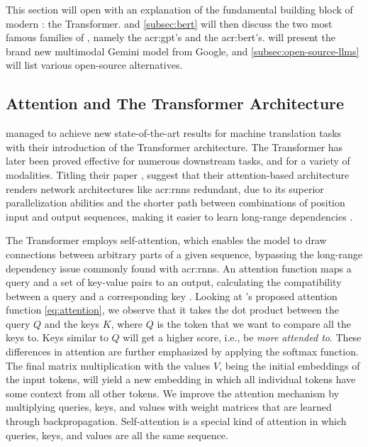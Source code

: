 This section will open with an explanation of the fundamental building block of modern : the Transformer.  and \autoref{subsec:bert} will then discuss the two most famous families of , namely the \acrshort{acr:gpt}'s and the \acrshort{acr:bert}'s.  will present the brand new multimodal Gemini model from Google, and \autoref{subsec:open-source-llms} will list various open-source alternatives.

\subsection{Attention and The Transformer Architecture}\label{subsec:attention-and-transformers}

\cite{vaswaniAttentionAllYou2017} managed to achieve new state-of-the-art results for machine translation tasks with their introduction of the Transformer architecture. The Transformer has later been proved effective for numerous downstream tasks, and for a variety of modalities. Titling their paper , \citeauthor{vaswaniAttentionAllYou2017} suggest that their attention-based architecture renders network architectures like \glspl{acr:rnn} redundant, due to its superior parallelization abilities and the shorter path between combinations of position input and output sequences, making it easier to learn long-range dependencies \citep[6]{vaswaniAttentionAllYou2017}.

The Transformer employs self-attention, which enables the model to draw connections between arbitrary parts of a given sequence, bypassing the long-range dependency issue commonly found with \glspl{acr:rnn}. An attention function maps a query and a set of key-value pairs to an output, calculating the compatibility between a query and a corresponding key \citep[3]{vaswaniAttentionAllYou2017}. Looking at \citeauthor{vaswaniAttentionAllYou2017}'s proposed attention function \eqref{eq:attention}, we observe that it takes the dot product between the query $Q$ and the keys $K$, where $Q$ is the token that we want to compare all the keys to. Keys similar to $Q$ will get a higher score, i.e., be \textit{more attended to}. These differences in attention are further emphasized by applying the softmax function. The final matrix multiplication with the values $V$, being the initial embeddings of the input tokens, will yield a new embedding in which all individual tokens have some context from all other tokens. We improve the attention mechanism by multiplying queries, keys, and values with weight matrices that are learned through backpropagation. Self-attention is a special kind of attention in which queries, keys, and values are all the same sequence.

